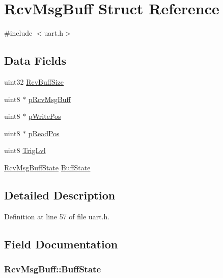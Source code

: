 \hypertarget{structRcvMsgBuff}{\section{Rcv\-Msg\-Buff Struct Reference}
\label{structRcvMsgBuff}
}


{\ttfamily \#include $<$uart.\-h$>$}

\subsection*{Data Fields}
\begin{DoxyCompactItemize}
\item 
uint32 \hyperlink{structRcvMsgBuff_a100e2cdf15349ae18fca2fbb67d5845b}{Rcv\-Buff\-Size}
\item 
uint8 $\ast$ \hyperlink{structRcvMsgBuff_a62921396b7988d167cdbfadaeaafa1ad}{p\-Rcv\-Msg\-Buff}
\item 
uint8 $\ast$ \hyperlink{structRcvMsgBuff_adcdca9d20078d517946d66d355579693}{p\-Write\-Pos}
\item 
uint8 $\ast$ \hyperlink{structRcvMsgBuff_aee50309a2497fffef33577ab901fe2cc}{p\-Read\-Pos}
\item 
uint8 \hyperlink{structRcvMsgBuff_a142735d44b7fefc09c930d58b5e70d4d}{Trig\-Lvl}
\item 
\hyperlink{uart_8h_ad2f40c3db0de470af22077a2f9a4a136}{Rcv\-Msg\-Buff\-State} \hyperlink{structRcvMsgBuff_a834e373c1fa1798f35fa38fd197674e0}{Buff\-State}
\end{DoxyCompactItemize}


\subsection{Detailed Description}


Definition at line 57 of file uart.\-h.



\subsection{Field Documentation}
\hypertarget{structRcvMsgBuff_a834e373c1fa1798f35fa38fd197674e0}{
\subsubsection[{Buff\-State}]{ Rcv\-Msg\-Buff\-::\-Buff\-State}}\label{structRcvMsgBuff_a834e373c1fa1798f35fa38fd197674e0}


